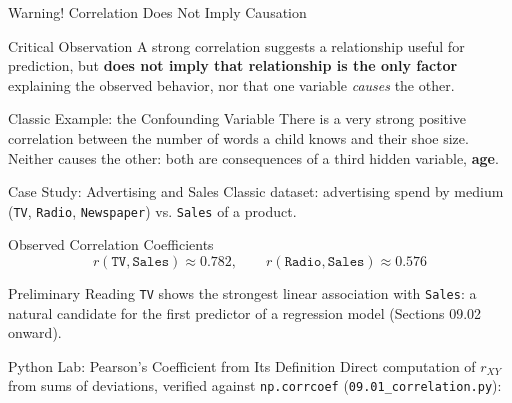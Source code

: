 \documentclass[10pt, aspectratio=169]{beamer}
\begin{document}
\begin{frame}{Warning! Correlation Does Not Imply Causation}
  \footnotesize
  \begin{alertblock}{Critical Observation}
    A strong correlation suggests a relationship useful for prediction, but \textbf{does not imply that relationship is the only factor} explaining the observed behavior, nor that one variable \emph{causes} the other.
  \end{alertblock}
  \pause

  \vspace{0.1cm}
  \begin{block}{Classic Example: the Confounding Variable}
    There is a very strong positive correlation between the number of words a child knows and their shoe size. Neither causes the other: both are consequences of a third hidden variable, \textbf{age}.
  \end{block}
\end{frame}

\begin{frame}{Case Study: Advertising and Sales}
  \footnotesize
  Classic dataset: advertising spend by medium (\texttt{TV}, \texttt{Radio}, \texttt{Newspaper}) vs. \texttt{Sales} of a product.
  \pause

  \vspace{0.1cm}
  \begin{block}{Observed Correlation Coefficients}
    $$r(\texttt{TV},\texttt{Sales})\approx0.782, \qquad r(\texttt{Radio},\texttt{Sales})\approx0.576$$
  \end{block}
  \pause

  \vspace{0.1cm}
  \begin{alertblock}{Preliminary Reading}
    \texttt{TV} shows the strongest linear association with \texttt{Sales}: a natural candidate for the first predictor of a regression model (Sections 09.02 onward).
  \end{alertblock}
\end{frame}

\begin{frame}[fragile]{Python Lab: Pearson's Coefficient from Its Definition}
  \scriptsize
  Direct computation of $r_{XY}$ from sums of deviations, verified against \texttt{np.corrcoef} (\texttt{09.01\_correlation.py}):
  {
  }
\end{frame}
\end{document}
